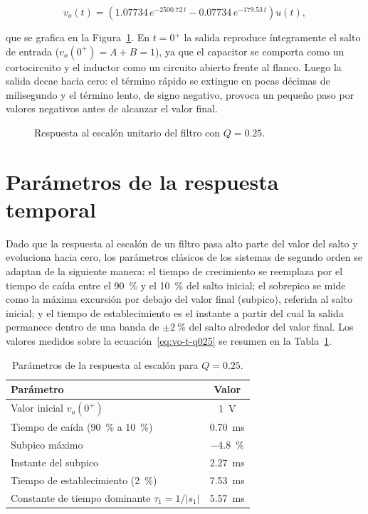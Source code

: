 \begin{equation}
  v_o(t) = \left(\num{1.07734}\, e^{-\num{2500.72}\, t} - \num{0.07734}\, e^{-\num{179.53}\, t}\right) u(t),
  \label{eq:vo-t-q025}
\end{equation}

que se grafica en la Figura~\ref{fig:escalon-q025}. En $t = 0^+$ la salida reproduce íntegramente el salto
de entrada ($v_o(0^+) = A + B = 1$), ya que el capacitor se comporta como un cortocircuito y el inductor
como un circuito abierto frente al flanco. Luego la salida decae hacia cero: el término rápido se extingue
en pocas décimas de milisegundo y el término lento, de signo negativo, provoca un pequeño paso por valores
negativos antes de alcanzar el valor final.

\begin{figure}[!ht]
  \centering
  
  \caption{Respuesta al escalón unitario del filtro con $Q = \num{0.25}$.}
  \label{fig:escalon-q025}
\end{figure}

\section{Parámetros de la respuesta temporal}

Dado que la respuesta al escalón de un filtro pasa alto parte del valor del salto y evoluciona hacia cero,
los parámetros clásicos de los sistemas de segundo orden se adaptan de la siguiente manera: el tiempo de
crecimiento se reemplaza por el tiempo de caída entre el \qty{90}{\percent} y el \qty{10}{\percent} del
salto inicial; el sobrepico se mide como la máxima excursión por debajo del valor final (subpico),
referida al salto inicial; y el tiempo de establecimiento es el instante a partir del cual la salida
permanece dentro de una banda de $\pm\qty{2}{\percent}$ del salto alrededor del valor final. Los valores
medidos sobre la ecuación~\eqref{eq:vo-t-q025} se resumen en la Tabla~\ref{tab:parametros-q025}.

\begin{table}[!ht]
  \centering
  \begin{tabular}{|l|c|}
    \hline
    Parámetro & Valor \\
    \hline
    Valor inicial $v_o(0^+)$                              & \qty{1}{\volt} \\
    Tiempo de caída (\qty{90}{\percent} a \qty{10}{\percent}) & \qty{0.70}{\milli\second} \\
    Subpico máximo                                        & \qty{-4.8}{\percent} \\
    Instante del subpico                                  & \qty{2.27}{\milli\second} \\
    Tiempo de establecimiento (\qty{2}{\percent})         & \qty{7.53}{\milli\second} \\
    Constante de tiempo dominante $\tau_1 = 1/|s_1|$      & \qty{5.57}{\milli\second} \\
    \hline
  \end{tabular}
  \caption{Parámetros de la respuesta al escalón para $Q = \num{0.25}$.}
  \label{tab:parametros-q025}
\end{table}

